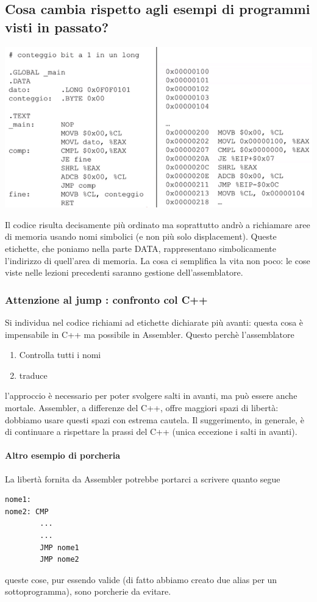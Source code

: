 \documentclass[11pt]{report}
\begin{document}
\subsection{Cosa cambia rispetto agli esempi di programmi visti in passato?}
\begin{center}
\includegraphics{img/48.PNG}
\end{center}
Il codice risulta decisamente più ordinato ma soprattutto andrò a richiamare aree di memoria usando nomi simbolici (e non più solo displacement). Queste etichette, che poniamo nella parte DATA, rappresentano simbolicamente l'indirizzo di quell'area di memoria. La cosa ci semplifica la vita non poco: le cose viste nelle lezioni precedenti saranno gestione dell'assemblatore.

\subsubsection{Attenzione al jump : confronto col C++}
Si individua nel codice richiami ad etichette dichiarate più avanti: questa cosa è impensabile in C++ ma possibile in Assembler. Questo perchè l'assemblatore
\begin{enumerate}
\item Controlla tutti i nomi
\item traduce
\end{enumerate}
l'approccio è necessario per poter svolgere salti in avanti, ma può essere anche mortale. Assembler, a differenze del C++, offre maggiori spazi di libertà: dobbiamo usare questi spazi con estrema cautela. Il suggerimento, in generale, è di continuare a rispettare la prassi del C++ (unica eccezione i salti in avanti). 
\paragraph{Altro esempio di porcheria} La libertà fornita da Assembler potrebbe portarci a scrivere quanto segue
\begin{verbatim}
nome1: 
nome2: CMP
        ...
        ...
        JMP nome1
        JMP nome2
\end{verbatim}
queste cose, pur essendo valide (di fatto abbiamo creato due alias per un sottoprogramma), sono porcherie da evitare.
\end{document}
